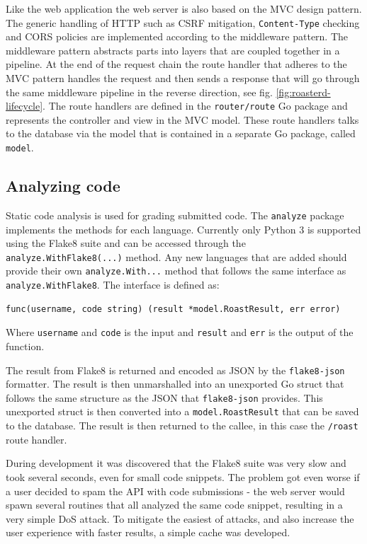 \documentclass[12pt,a4paper]{report}
\begin{document}
Like the web application the web server is also based on the MVC design pattern. The generic handling of HTTP such as CSRF mitigation, \texttt{Content-Type} checking and CORS policies are implemented according to the middleware pattern. The middleware pattern abstracts parts into layers that are coupled together in a pipeline. At the end of the request chain the route handler that adheres to the MVC pattern handles the request and then sends a response that will go through the same middleware pipeline in the reverse direction, see fig. \ref{fig:roasterd-lifecycle}. The route handlers are defined in the \texttt{router/route}\cite{roaster-router-route} Go package and represents the controller and view in the MVC model. These route handlers talks to the database via the model that is contained in a separate Go package, called \texttt{model}\cite{roaster-model}.

\subsection{Analyzing code}
Static code analysis is used for grading submitted code. The \texttt{analyze} package implements the methods for each language. Currently only Python 3 is supported using the Flake8 suite and can be accessed through the \texttt{analyze.WithFlake8(...)}\cite{roasterd-analyze-withflake8} method. Any new languages that are added should provide their own \texttt{analyze.With...} method that follows the same interface as \texttt{analyze.WithFlake8}. The interface is defined as:
\begin{verbatim}
func(username, code string) (result *model.RoastResult, err error)
\end{verbatim}
Where \texttt{username} and \texttt{code} is the input and \texttt{result} and \texttt{err} is the output of the function.

The result from Flake8 is returned and encoded as JSON by the \texttt{flake8-json}\cite{flake8-json} formatter. The result is then unmarshalled into an unexported Go struct that follows the same structure as the JSON that \texttt{flake8-json} provides. This unexported struct is then converted into a \texttt{model.RoastResult} that can be saved to the database. The result is then returned to the callee, in this case the \texttt{/roast} route handler.

During development it was discovered that the Flake8 suite was very slow and took several seconds, even for small code snippets. The problem got even worse if a user decided to spam the API with code submissions - the web server would spawn several routines that all analyzed the same code snippet, resulting in a very simple DoS attack. To mitigate the easiest of attacks, and also increase the user experience with faster results, a simple cache was developed.
\end{document}
